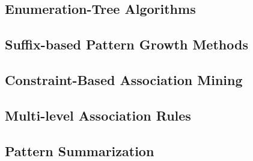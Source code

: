 \documentclass{article}
\begin{document}
\subsection{Enumeration-Tree Algorithms}
\subsection{Suffix-based Pattern Growth Methods}
\subsection{Constraint-Based Association Mining}
\subsection{Multi-level Association Rules}
\subsection{Pattern Summarization}
\end{document}
